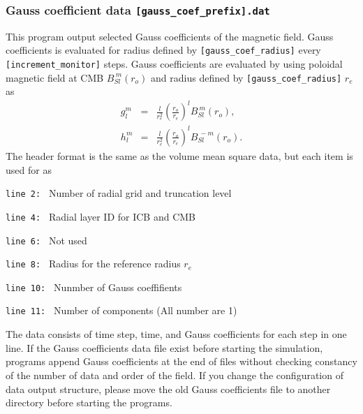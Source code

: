 \subsubsection{Gauss coefficient data {\tt [gauss\_coef\_prefix].dat}}
This program output selected Gauss coefficients of the magnetic field. Gauss coefficients is evaluated for radius defined by \verb|[gauss_coef_radius]| every \verb|[increment_monitor]| steps. Gauss coefficients are evaluated by using poloidal magnetic field at CMB $B_{Sl}^{\ m}(r_{o})$ and radius defined by \verb|[gauss_coef_radius]| $r_{e}$ as
%
\begin{eqnarray}
g_{l}^{m} &=& \frac{l}{r_{e}^2} \left(\frac{r_{o}}{r_{e}}\right)^{l} B_{Sl}^{\ m}(r_{o}),
\nonumber \\
h_{l}^{m} &=& \frac{l}{r_{e}^2} \left(\frac{r_{o}}{r_{e}}\right)^{l} B_{Sl}^{\ -m}(r_{o}).
\nonumber
\end{eqnarray}
%
The header format is the same as the volume mean square data, but each item is used for as 
%
\begin{description}
\item{\tt  line 2: } Number of radial grid and truncation level
\item{\tt  line 4: } Radial layer ID for ICB and CMB
\item{\tt  line 6: } Not used
\item{\tt  line 8: } Radius for the reference radius $r_{e}$
\item{\tt  line 10: } Nunmber of Gauss coeffifients
\item{\tt  line 11: } Number of components (All number are 1)
\end{description}
%
%
The data consists of time step, time, and Gauss coefficients for each step in one line. If the Gauss coefficients data file exist before starting the simulation, programs append Gauss coefficients at the end of files without checking constancy of the number of data and order of the field. If you change the configuration of data output structure, please move the old Gauss coefficients file to another directory before starting the programs.

